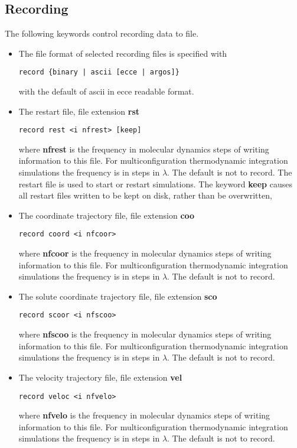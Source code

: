 \subsection{Recording}
The following keywords control recording data to file.
\begin{itemize}
\item
The file format of selected recording files is specified with
\begin{verbatim}
record {binary | ascii [ecce | argos]}
\end{verbatim}
with the default of ascii in ecce readable format.
\item
The restart file, file extension {\bf rst}
\begin{verbatim}
record rest <i nfrest> [keep]
\end{verbatim}
where {\bf nfrest} is the frequency in molecular dynamics steps
of writing information to this file. For multiconfiguration
thermodynamic integration simulations the frequency is in
steps in $\lambda$. The default is not to record. The restart
file is used to start or restart simulations. The keyword {\bf keep}
causes all restart files written to be kept on disk, rather than
be overwritten, 
\item
The coordinate trajectory file, file extension {\bf coo}
\begin{verbatim}
record coord <i nfcoor>
\end{verbatim}
where {\bf nfcoor} is the frequency in molecular dynamics steps
of writing information to this file. For multiconfiguration
thermodynamic integration simulations the frequency is in
steps in $\lambda$. The default is not to record.
\item
The solute coordinate trajectory file, file extension {\bf sco}
\begin{verbatim}
record scoor <i nfscoo>
\end{verbatim}
where {\bf nfscoo} is the frequency in molecular dynamics steps
of writing information to this file. For multiconfiguration
thermodynamic integration simulations the frequency is in
steps in $\lambda$. The default is not to record.
\item
The velocity trajectory file, file extension {\bf vel}
\begin{verbatim}
record veloc <i nfvelo>
\end{verbatim}
where {\bf nfvelo} is the frequency in molecular dynamics steps
of writing information to this file. For multiconfiguration
thermodynamic integration simulations the frequency is in
steps in $\lambda$. The default is not to record.

\end{itemize}

